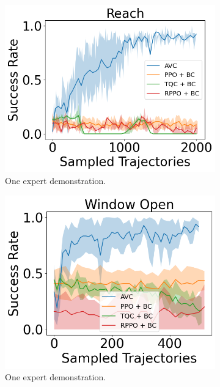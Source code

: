 \begin{figure}[htbp]
    \centering
    \begin{subfigure}[t]{0.32\textwidth}
      \includegraphics[width=\textwidth]{images/1_2000/Reach.png}
      \caption{One expert demonstration.}
    \end{subfigure}
    \begin{subfigure}[t]{0.32\textwidth}
      \includegraphics[width=\textwidth]{images/1_2000/Window Open.png}
      \caption{One expert demonstration.}
    \end{subfigure}
    \begin{subfigure}[t]{0.32\textwidth}

\end{subfigure}
\end{figure}
